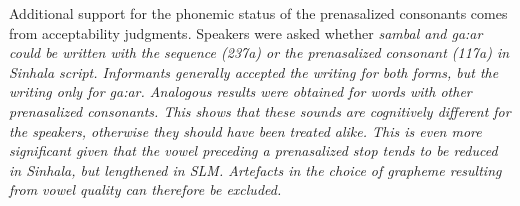 % 

Additional support for the phonemic status of the prenasalized consonants comes from acceptability judgments. Speakers were asked whether \em sambal \em and \em ga:\mb ar \em could be written with the sequence  ({\SHa{}}{\SHa\-\char237a}) or the prenasalized consonant \graphem{\mb} ({\SHb\char117a}) in Sinhala script. Informants generally accepted the writing  for both forms, but the writing \graphem{\mb} only for \em ga:\mb ar\em. Analogous results were obtained for words with other prenasalized consonants. This shows that these sounds are cognitively different for the speakers, otherwise they should have been treated alike. This is even more significant given that the vowel preceding a prenasalized stop tends to be reduced in Sinhala, but lengthened in SLM. Artefacts in the choice of grapheme resulting from vowel quality can therefore be excluded.

